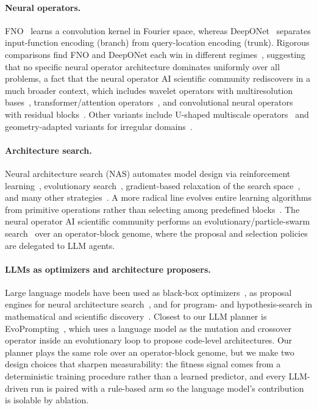 \documentclass{article}
\begin{document}
\paragraph{Neural operators.} FNO~\cite{li2021fno} learns a convolution kernel in Fourier
space, whereas DeepONet~\cite{lu2021deeponet} separates input-function encoding (branch) from query-location encoding (trunk). Rigorous comparisons find FNO and DeepONet each win in different regimes~\cite{lulu2022comparison}, suggesting that no specific neural operator architecture dominates uniformly over all problems, a fact that the neural operator AI scientific community rediscovers in a much broader context, which includes  wavelet operators with multiresolution bases~\cite{tripura2023wno}, transformer/attention operators~\cite{cao2021galerkin,hao2023gnot}, and convolutional neural operators with residual blocks~\cite{raonic2023convolutional}. Other variants include U-shaped multiscale operators~\cite{rahman2023uno} and geometry-adapted variants for irregular domains~\cite{li2023geofno}.

\paragraph{Architecture search.} Neural architecture search (NAS) automates model
design via reinforcement learning~\cite{zoph2017nasrl}, evolutionary search~\cite{real2019regevo}, gradient-based relaxation of the search space~\cite{liu2019darts}, and many other strategies~\cite{elsken2019nassurvey}. A more radical line evolves entire learning algorithms from primitive operations rather than selecting among predefined blocks~\cite{real2020automlzero}. The neural operator AI scientific community performs an evolutionary/particle-swarm  search~\cite{kennedy1995pso} over an operator-block genome, where the proposal and selection policies are delegated to LLM agents.

\paragraph{LLMs as optimizers and architecture proposers.} Large language models have
been used as black-box optimizers~\cite{yang2024opro}, as proposal engines for neural architecture search~\cite{zheng2023genius}, and for program- and hypothesis-search in mathematical and scientific discovery~\cite{romeraparedes2024funsearch}. Closest to our LLM planner is EvoPrompting~\cite{chen2023evoprompting}, which uses a language model as the mutation and crossover operator inside an evolutionary loop to propose code-level architectures. Our planner plays the same role over an operator-block genome, but we make two design choices that sharpen measurability: the fitness signal comes from a deterministic training procedure rather than a learned predictor, and every LLM-driven run is paired with a rule-based arm so the language model's contribution is isolable by ablation.
\end{document}
